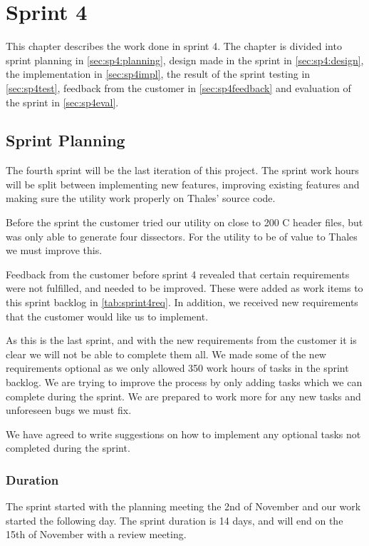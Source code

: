 \chapter{Sprint 4}
This chapter describes the work done in sprint 4. The 
chapter is divided into sprint planning in \autoref{sec:sp4:planning}, design 
made in the sprint in \autoref{sec:sp4:design}, the implementation in 
\autoref{sec:sp4impl}, the result of the sprint testing in 
\autoref{sec:sp4test}, feedback from the customer in 
\autoref{sec:sp4feedback} and evaluation of the sprint in 
\autoref{sec:sp4eval}.

\section{Sprint Planning}
\label{sec:sp4:planning}
The fourth sprint will be the last iteration of this project.
The sprint work hours will be split between implementing new features,
improving existing features and making sure the \gls{utility} work properly
on Thales' source code.

Before the sprint the customer tried our \gls{utility} on close to 200 C
header files, but was only able to generate four \glspl{dissector}.
For the \gls{utility} to be of value to Thales we must improve this.

Feedback from the customer before sprint 4 revealed that certain requirements
were not fulfilled, and needed to be improved. These were added as work items
to this sprint backlog in \autoref{tab:sprint4req}. In addition, we received new
requirements that the customer would like us to implement.

As this is the last sprint, and with the new requirements from the customer it
is clear we will not be able to complete them all. We made some of the new
requirements optional as we only allowed 350 work hours of tasks in the sprint
backlog. We are trying to improve the process by only adding tasks which we
can complete during the sprint. We are prepared to work more for any new tasks
and unforeseen bugs we must fix.

We have agreed to write suggestions on how to implement any optional tasks
not completed during the sprint.

\subsection{Duration}
The sprint started with the planning meeting the 2nd of November and our work started the following day. The sprint duration is 14 days, and will end on the 15th of November with a review meeting. 

